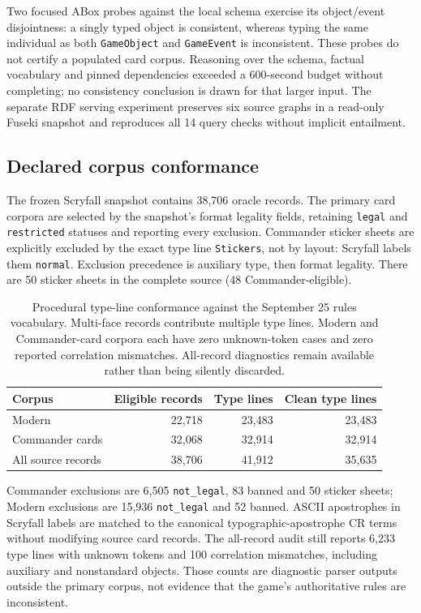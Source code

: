 \documentclass[11pt,a4paper]{article}
\begin{document}
Two focused ABox probes against the local schema exercise its object/event disjointness: a singly typed object is consistent, whereas typing the same individual as both \texttt{GameObject} and \texttt{GameEvent} is inconsistent. These probes do not certify a populated card corpus. Reasoning over the schema, factual vocabulary and pinned dependencies exceeded a 600-second budget without completing; no consistency conclusion is drawn for that larger input. The separate RDF serving experiment preserves six source graphs in a read-only Fuseki snapshot and reproduces all 14 query checks without implicit entailment.

\subsection{Declared corpus conformance}
\label{sec:corpus}

The frozen Scryfall snapshot contains 38{,}706 oracle records. The primary card corpora are selected by the snapshot's format legality fields, retaining \texttt{legal} and \texttt{restricted} statuses and reporting every exclusion. Commander sticker sheets are explicitly excluded by the exact type line \texttt{Stickers}, not by layout: Scryfall labels them \texttt{normal}. Exclusion precedence is auxiliary type, then format legality. There are 50 sticker sheets in the complete source (48 Commander-eligible).

\begin{table}[h]
\centering
\small
\begin{tabular}{lrrr}
\toprule
Corpus & Eligible records & Type lines & Clean type lines \\
\midrule
Modern & 22{,}718 & 23{,}483 & 23{,}483 \\
Commander cards & 32{,}068 & 32{,}914 & 32{,}914 \\
All source records & 38{,}706 & 41{,}912 & 35{,}635 \\
\bottomrule
\end{tabular}
\caption{Procedural type-line conformance against the September 25 rules vocabulary. Multi-face records contribute multiple type lines. Modern and Commander-card corpora each have zero unknown-token cases and zero reported correlation mismatches. All-record diagnostics remain available rather than being silently discarded.}
\end{table}

Commander exclusions are 6{,}505 \texttt{not\_legal}, 83 banned and 50 sticker sheets; Modern exclusions are 15{,}936 \texttt{not\_legal} and 52 banned. ASCII apostrophes in Scryfall labels are matched to the canonical typographic-apostrophe CR terms without modifying source card records. The all-record audit still reports 6{,}233 type lines with unknown tokens and 100 correlation mismatches, including auxiliary and nonstandard objects. Those counts are diagnostic parser outputs outside the primary corpus, not evidence that the game's authoritative rules are inconsistent.
\end{document}
